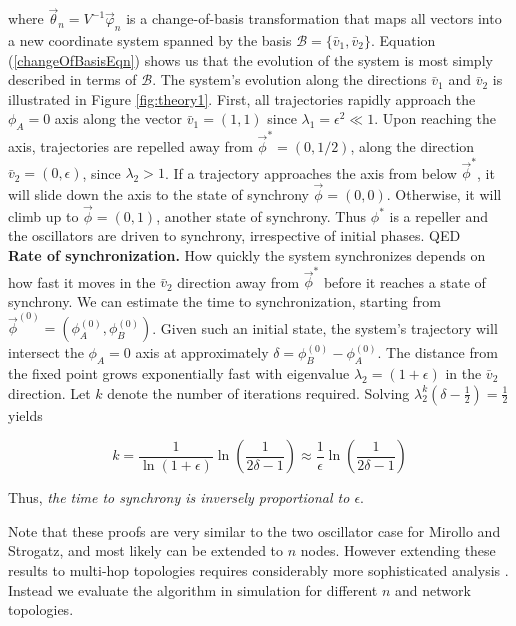 \documentclass{sig-alternate}
\begin{document}
{where $\vec{\theta}_{n}=V^{-1}\vec{\varphi}_n$ is a change-of-basis
transformation that maps all vectors into a new coordinate system
spanned by the basis $\mathcal{B}=\{\bar{v}_1, \bar{v}_2\}$. Equation
(\ref{changeOfBasisEqn}) shows us that the evolution of the system is
most simply described in terms of $\mathcal{B}$. The system's
evolution along the directions $\bar{v}_1$ and $\bar{v}_2$ is
illustrated in Figure \ref{fig:theory1}. First, all trajectories
rapidly approach the $\phi_A=0$ axis along the vector
$\bar{v}_1=(1,1)$ since $\lambda_1=\epsilon^2 \ll 1$. Upon reaching
the axis, trajectories are repelled away from $\vec{\phi}^*=(0, 1/2)$,
along the direction $\bar{v}_2=(0,\epsilon)$, since $\lambda_2 >
1$. If a trajectory approaches the axis from below $\vec{\phi}^*$, it
will slide down the axis to the state of synchrony
$\vec{\phi}=(0,0)$. Otherwise, it will climb up to $\vec{\phi}=(0,1)$,
another state of synchrony. Thus $\phi^*$ is a repeller and the
oscillators are driven to synchrony, irrespective of initial
phases. QED\\

{\bf Rate of synchronization.} How quickly the system
synchronizes depends on how fast it moves in the $\bar{v}_2$ direction
away from $\vec{\phi}^*$ before it reaches a state of synchrony. We
can estimate the time to synchronization, starting from
$\vec{\phi}^{(0)}=(\phi_A^{(0)}, \phi_B^{(0)})$. Given such an initial
state, the system's trajectory will intersect the $\phi_A=0$ axis at
approximately $\delta=\phi_B^{(0)}-\phi_A^{(0)}$. The distance from
the fixed point grows exponentially fast with eigenvalue
$\lambda_2=(1+\epsilon)$ in the $\bar{v}_2$ direction. Let $k$ denote
the number of iterations required. Solving $\lambda_2^k
(\delta-\frac{1}{2}) = \frac{1}{2}$ yields

\begin{equation}\label{rateOfSync}
    k = \frac{1}{\ln(1+\epsilon)} \ln(\frac{1}{2\delta-1}) \approx
    \frac{1}{\epsilon} \ln(\frac{1}{2\delta-1})
\end{equation}

Thus, \emph{the time to synchrony is inversely proportional to
$\epsilon$}.

\newpage

Note that these proofs are very similar to the two oscillator case for
Mirollo and Strogatz, and most likely can be extended to $n$
nodes. However extending these results to multi-hop topologies
requires considerably more sophisticated analysis
\cite{lucarelli04}. Instead we evaluate the algorithm in simulation
for different $n$ and network topologies.

}
\end{document}
